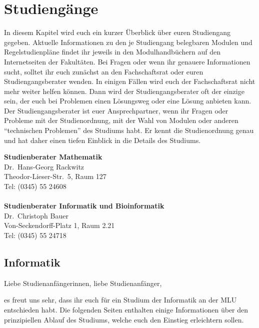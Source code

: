 
\section{Studiengänge}

In diesem Kapitel wird euch ein kurzer Überblick über euren Studiengang gegeben. Aktuelle Informationen zu den je Studiengang belegbaren Modulen und Regelstudienpläne findet ihr jeweils in den Modulhandbüchern auf den Internetseiten der Fakultäten.
Bei Fragen oder wenn ihr genauere Informationen sucht, solltet ihr euch zunächst an den Fachschaftsrat oder euren Studiengangsberater wenden.
In einigen Fällen wird euch der Fachschaftsrat nicht mehr weiter helfen können.
Dann wird der Studiengangsberater oft der einzige sein, der euch bei Problemen einen Lösungsweg oder eine Lösung anbieten kann.
Der Studiengangsberater ist euer Ansprechpartner, wenn ihr Fragen oder Probleme
mit der Studienordnung, mit der Wahl von Modulen oder anderen \enquote{technischen Problemen} des Studiums habt.
Er kennt die Studienordnung genau und hat daher einen tiefen Einblick in die Details des Studiums.

\textbf{Studienberater Mathematik}\\
Dr.\ Hans-Georg Rackwitz\\
Theodor-Lieser-Str.\ 5, Raum 127\\
Tel: (0345) 55 24608\\
\\

\textbf{Studienberater Informatik und Bioinformatik}\\
Dr.\ Christoph Bauer\\
Von-Seckendorff-Platz 1, Raum 2.21\\
Tel: (0345) 55 24718\\



\subsection{Informatik}
\label{studiengang_informatik}

Liebe Studienanfängerinnen, liebe Studienanfänger,\par

es freut uns sehr, dass ihr euch für ein Studium der Informatik an der MLU entschieden habt. Die folgenden Seiten enthalten einige Informationen über den prinzipiellen Ablauf des Studiums, welche euch den Einstieg erleichtern sollen.\par

